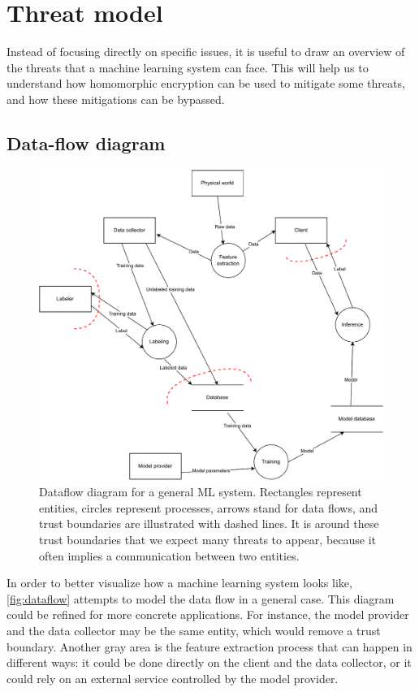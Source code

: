 \documentclass[a4paper,11pt,oneside]{report}
\begin{document}
\section{Threat model}

Instead of focusing directly on specific issues, it is useful to draw an overview of the threats that a machine learning system can face.
This will help us to understand how homomorphic encryption can be used to mitigate some threats, and how these mitigations can be bypassed.

\subsection{Data-flow diagram}

\begin{figure}[p]
    \centering
    \includegraphics[width=\textwidth]{figures/dataflow-ml.pdf}
    \caption{Dataflow diagram for a general ML system. Rectangles represent entities, circles represent processes, arrows stand for data flows, and trust boundaries are illustrated with dashed lines. It is around these trust boundaries that we expect many threats to appear, because it often implies a communication between two entities.}
    \label{fig:dataflow}
\end{figure}

In order to better visualize how a machine learning system looks like, \autoref{fig:dataflow} attempts to model the data flow in a general case. 
This diagram could be refined for more concrete applications. 
For instance, the model provider and the data collector may be the same entity, which would remove a trust boundary. 
Another gray area is the feature extraction process that can happen in different ways: it could be done directly on the client and the data collector, or it could rely on an external service controlled by the model provider.
\end{document}
